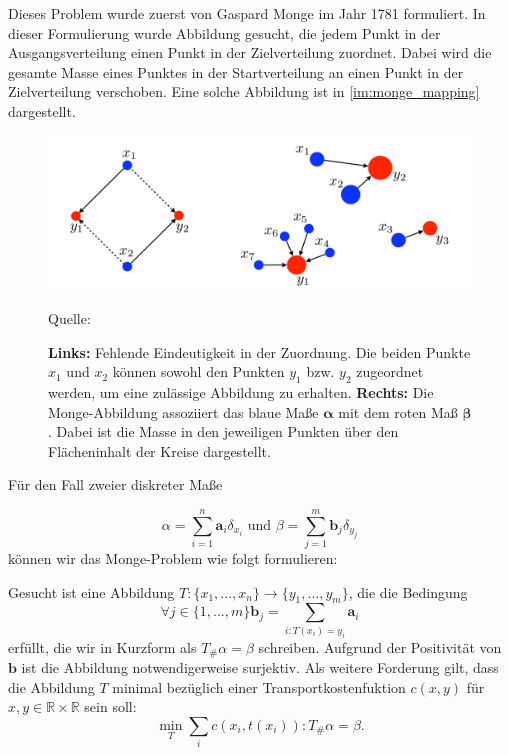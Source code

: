 \documentclass[11pt,a4paper]{article}
\newcommand{\source}[1]{\caption*{\hfill Quelle: {#1}} }
\numberwithin{equation}{section}
\begin{document}
	Dieses Problem wurde zuerst von Gaspard Monge im Jahr 1781 formuliert. In dieser Formulierung wurde Abbildung gesucht, die jedem Punkt in der Ausgangsverteilung einen Punkt in der Zielverteilung zuordnet. Dabei wird die gesamte Masse eines Punktes in der Startverteilung an einen Punkt in der Zielverteilung verschoben. Eine solche Abbildung ist in \autoref{im:monge_mapping} dargestellt.
	
	\begin{figure}[ht]
		\centering
		\includegraphics[width=0.3\textheight]{monge_mapping.png}
		\caption[Monge-Abbildung]{\textbf{Links:} Fehlende Eindeutigkeit in der Zuordnung. Die beiden Punkte $x_1$ und $x_2$ können sowohl den Punkten $y_1$ bzw. $y_2$ zugeordnet werden, um eine zulässige Abbildung zu erhalten. \textbf{Rechts:} Die Monge-Abbildung assoziiert das blaue Maße $\boldsymbol{\alpha}$ mit dem roten Maß $\boldsymbol{\beta}$. Dabei ist die Masse in den jeweiligen Punkten über den Flächeninhalt der Kreise dargestellt.}
		\source{\cite{COTcuturi}}
		\label{im:monge_mapping}
	\end{figure}
	
	
	
	
	
	Für den Fall zweier diskreter Maße
	
	\begin{equation}
	\alpha = \sum_{i=1}^n{\boldsymbol{a}_i\delta_{x_i}} \text{ und } \beta = \sum_{j=1}^m{\boldsymbol{b}_j\delta_{y_j}}
	\end{equation}
	können wir das Monge-Problem  wie folgt formulieren:
	
	Gesucht ist eine Abbildung $T:\lbrace x_1, ..., x_n \rbrace \to \lbrace y_1,...,y_m \rbrace$, die die Bedingung 
	\begin{equation}
	\forall j \in \lbrace 1,...,m \rbrace \boldsymbol{b}_j= \sum_{i:T(x_i)=y_i}{\boldsymbol{a}_i}
	\end{equation}
	erfüllt, die wir in Kurzform als $T_\#\alpha = \beta$ schreiben. Aufgrund der Positivität von $\boldsymbol{b}$ ist die Abbildung notwendigerweise surjektiv.
	Als weitere Forderung gilt, dass die Abbildung $T$ minimal bezüglich einer Transportkostenfuktion $c(x,y)$ für $x,y \in \mathbb{R} \times \mathbb{R}$ sein soll:
	\begin{equation}
	\min_T{\sum_i{c(x_i, t(x_i)) : T_\#\alpha =  \beta}}.
	\end{equation} 
	
\end{document}
